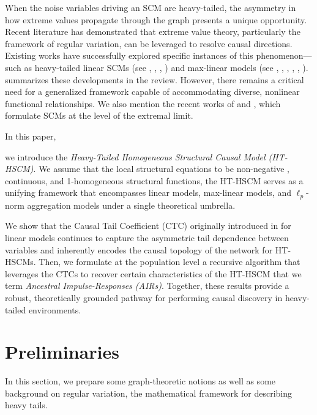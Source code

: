 \documentclass[10pt]{article}
\begin{document}
When the noise variables driving an SCM are heavy-tailed, the asymmetry in how extreme values propagate through the graph presents a unique opportunity. Recent literature has demonstrated that extreme value theory, particularly the framework of regular variation, can be leveraged to resolve causal directions. Existing works have successfully explored specific instances of this phenomenon---such as heavy-tailed linear SCMs (see \cite{gnecco2021causal}, \cite{pasche2023causal}, \cite{krali2025causal}, \cite{jiang2025separation}) and max-linear models (see \cite{kluppelberg2021estimating}, \cite{buck2021recursive}, \cite{gissibl2018tail}, \cite{tran2024estimating}, \cite{amendola2022conditional},  \cite{adams2025inference}). \cite{chavez2024causality} summarizes these developments in the review. However, there remains a critical need for a generalized framework capable of accommodating diverse, nonlinear functional relationships. We also mention the recent works of \cite{fang2025structural} and \cite{engelke2025extremes}, which formulate SCMs  at the level of the extremal limit.
 

In this paper, 
 
we introduce the \emph{Heavy-Tailed Homogeneous Structural Causal Model (HT-HSCM)}. We assume that the local structural equations to be non-negative , continuous, and 1-homogeneous structural functions, the HT-HSCM serves as a unifying framework that   encompasses   linear models,   max-linear models, and $\ell_p$-norm aggregation models under a single theoretical umbrella. 

 
We show that the Causal Tail Coefficient (CTC)  originally introduced  in \cite{gnecco2021causal} for linear models continues to capture the asymmetric tail dependence between variables and inherently encodes the causal topology of the network for  HT-HSCMs.
Then, we formulate at the population level a recursive algorithm that leverages  the CTCs   to  recover certain   characteristics of the HT-HSCM that we term \emph{Ancestral Impulse-Responses (AIRs)}. Together, these results provide a robust, theoretically grounded pathway for performing causal discovery in   heavy-tailed environments.






\section{Preliminaries}

In this section, we prepare some   graph-theoretic notions as well as some  background on regular variation, the mathematical framework for describing heavy tails.
\end{document}
